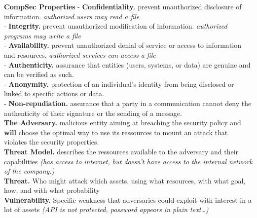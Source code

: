 \documentclass[main.tex]{subfiles}
\begin{document}
\begin{minipage}[t]{0.495\textwidth}
	\noindent\textbf{CompSec Properties}
	- \textbf{Confidentiality}. prevent unauthorized disclosure of information. \textit{authorized users may read a file}\\
	- \textbf{Integrity.} prevent unauthorized modification of information. \textit{authorized programs may write a file}\\
	- \textbf{Availability.} prevent unauthorized denial of service or access to information and resources. \textit{authorized services can access a file}\\
	- \textbf{Authenticity.} assurance that entities (users, systems, or data) are genuine and can be verified as such.\\
	- \textbf{Anonymity.} protection of an individual's identity from being disclosed or linked to specific actions or data.\\
	- \textbf{Non-repudiation.} assurance that a party in a communication cannot deny the authenticity of their signature or the sending of a message.\\
	\noindent\textbf{The Adversary.} malicious entity aiming at breaching the security policy and \textbf{will} choose the optimal way to use its ressources to mount an attack that violates the security properties.\\
	\noindent \textbf{Threat Model.} describes the ressources available to the adversary and their capabilities \textit{(has access to internet, but doesn't have access to the internal network of the company.)}\\
	\noindent \textbf{Threat.} Who might attack which assets, using what resources, with what goal, how, and with what probability\\
	\noindent \textbf{Vulnerability.} Specific weakness that adversaries could exploit with interest in a lot of assets \textit{(API is not protected, password appears in plain text\dots)}\\
\end{minipage}
\hfill
\noindent
\end{document}
